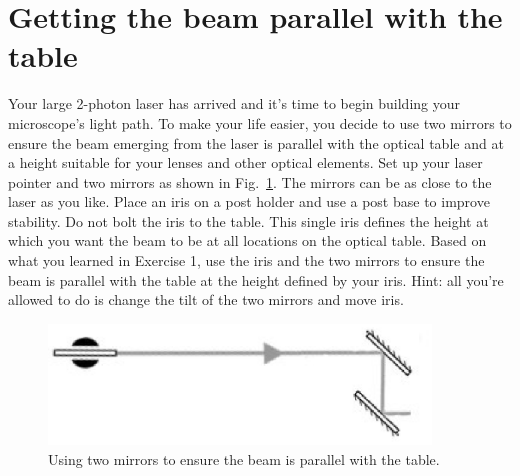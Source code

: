 \documentclass[a4paper]{report}
\begin{document}
\section{Getting the beam parallel with the table}
Your large 2-photon laser has arrived and it's time to begin building your microscope's light path. 
To make your life easier, you decide to use two mirrors to ensure the beam emerging from the laser is parallel with the optical table and at a height suitable for your lenses and other optical elements. 
Set up your laser pointer and two mirrors as shown in Fig.~\ref{fig:ex2}. 
The mirrors can be as close to the laser as you like. 
Place an iris on a post holder and use a post base to improve stability. 
Do not bolt the iris to the table.
This single iris defines the height at which you want the beam to be at all locations on the optical table. 
Based on what you learned in Exercise 1, use the iris and the two mirrors to ensure the beam is parallel with the table at the height defined by your iris. 
Hint: all you're allowed to do is change the tilt of the two mirrors and move iris.


\begin{figure}[h]
\center
\includegraphics[width=4in]{laser_height.eps}
\caption{Using two mirrors to ensure the beam is parallel with the table. }
\label{fig:ex2}
\end{figure}
\end{document}
